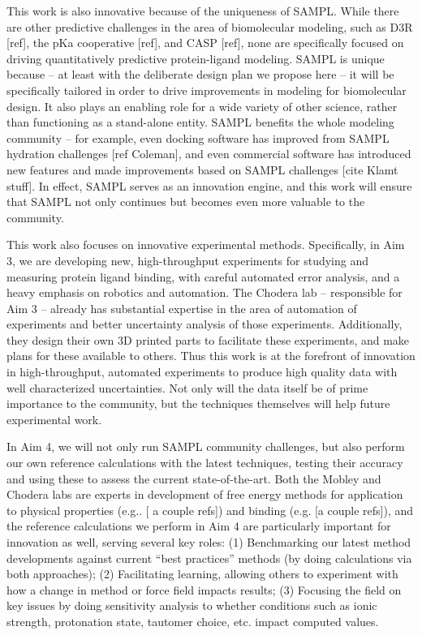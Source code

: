 \documentclass[11pt]{article}
\begin{document}
This work is also innovative because of the uniqueness of SAMPL.
While there are other predictive challenges in the area of biomolecular modeling, such as D3R [ref], the pKa cooperative [ref], and CASP [ref],
none are specifically focused on driving quantitatively predictive protein-ligand modeling.
SAMPL is unique because -- at least with the deliberate design plan we propose here -- it will be specifically tailored in order to drive improvements in modeling for biomolecular design.
It also plays an enabling role for a wide variety of other science, rather than functioning as a stand-alone entity. 
SAMPL benefits the whole modeling community -- for example, even docking software has improved from SAMPL hydration challenges [ref Coleman], and even commercial software has introduced new features and made improvements based on SAMPL challenges [cite Klamt stuff].
In effect, SAMPL serves as an innovation engine, and this work will ensure that SAMPL not only continues but becomes even more valuable to the community.
 

This work also focuses on innovative experimental methods.
Specifically, in Aim 3, we are developing new, high-throughput experiments for studying and measuring protein ligand binding, with careful automated error analysis, and a heavy emphasis on robotics and automation.
The Chodera lab -- responsible for Aim 3 -- already has substantial expertise in the area of automation of experiments and better uncertainty analysis of those experiments. 
Additionally, they design their own 3D printed parts to facilitate these experiments, and make plans for these available to others. 
Thus this work is at the forefront of innovation in high-throughput, automated experiments to produce high quality data with well characterized uncertainties. 
Not only will the data itself be of prime importance to the community, but the techniques themselves will help future experimental work.

In Aim 4, we will not only run SAMPL community challenges, but also perform our own reference calculations with the latest techniques, testing their accuracy and using these to assess the current state-of-the-art.
Both the Mobley and Chodera labs are experts in development of free energy methods for application to physical properties (e.g.. [ a couple refs]) and binding (e.g. [a couple refs]), and the reference calculations we perform in Aim 4 are particularly important for innovation as well, serving several key roles: (1) Benchmarking our latest method developments against current ``best practices'' methods (by doing calculations via both approaches); (2) Facilitating learning, allowing others to experiment with how a change in method or force field impacts results; (3) Focusing the field on key issues by doing sensitivity analysis to whether conditions such as ionic strength, protonation state, tautomer choice, etc. impact computed values.
\end{document}
